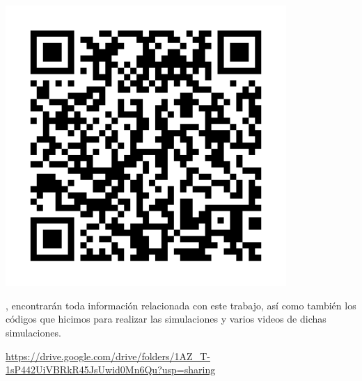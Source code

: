 \begin{marginfigure}
\includegraphics[width=0.8\textwidth]{Im/qr_img.png}
\end{marginfigure}
\vspace{4cm}
, encontrarán toda información relacionada con este trabajo, así como también los códigos que hicimos para realizar las simulaciones y varios videos de dichas simulaciones.

\textcolor{myred}{\underline{\url{https://drive.google.com/drive/folders/1AZ_T-1sP442UiVBRkR45JsUwid0Mn6Qu?usp=sharing}}}


